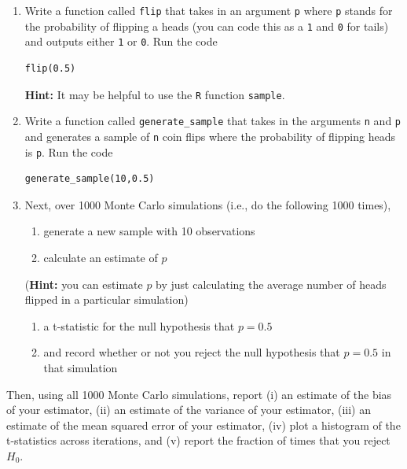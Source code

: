 \documentclass[
  letterpaper,
  DIV=11,
  numbers=noendperiod]{scrreprt}
\begin{document}
\begin{enumerate}
\def\labelenumi{\arabic{enumi}.}
\item
  Write a function called \texttt{flip} that takes in an argument
  \texttt{p} where \texttt{p} stands for the probability of flipping a
  heads (you can code this as a \texttt{1} and \texttt{0} for tails) and
  outputs either \texttt{1} or \texttt{0}. Run the code

\begin{verbatim}
flip(0.5)
\end{verbatim}

  \textbf{Hint:} It may be helpful to use the \texttt{R} function
  \texttt{sample}.
\item
  Write a function called \texttt{generate\_sample} that takes in the
  arguments \texttt{n} and \texttt{p} and generates a sample of
  \texttt{n} coin flips where the probability of flipping heads is
  \texttt{p}. Run the code

\begin{verbatim}
generate_sample(10,0.5)
\end{verbatim}
\item
  Next, over 1000 Monte Carlo simulations (i.e., do the following 1000
  times),

  \begin{enumerate}
  \def\labelenumii{(\roman{enumii})}
  \item
    generate a new sample with 10 observations
  \item
    calculate an estimate of \(p\)
  \end{enumerate}

  (\textbf{Hint:} you can estimate \(p\) by just calculating the average
  number of heads flipped in a particular simulation)

  \begin{enumerate}
  \def\labelenumii{(\roman{enumii})}
  \setcounter{enumii}{2}
  \item
    a t-statistic for the null hypothesis that \(p=0.5\)
  \item
    and record whether or not you reject the null hypothesis that
    \(p=0.5\) in that simulation
  \end{enumerate}
\end{enumerate}

Then, using all 1000 Monte Carlo simulations, report (i) an estimate of
the bias of your estimator, (ii) an estimate of the variance of your
estimator, (iii) an estimate of the mean squared error of your
estimator, (iv) plot a histogram of the t-statistics across iterations,
and (v) report the fraction of times that you reject \(H_0\).
\end{document}
